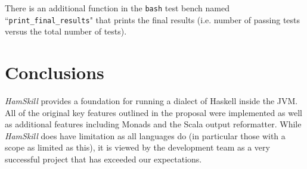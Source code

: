 \documentclass{report}
\begin{document}
There is an additional function in the \texttt{bash} test bench named ``\texttt{print\_final\_results}" that prints the final results (i.e. number of passing tests versus the total number of tests).

\section{Conclusions}

\textit{HamSkill} provides a foundation for running a dialect of Haskell inside the JVM.  All of the original key features outlined in the proposal were implemented as well as additional features including Monads and the Scala output reformatter.  While \textit{HamSkill} does have limitation as all languages do (in particular those with a scope as limited as this), it is viewed by the development team as a very successful project that has exceeded our expectations.

\pagebreak


\end{document}
